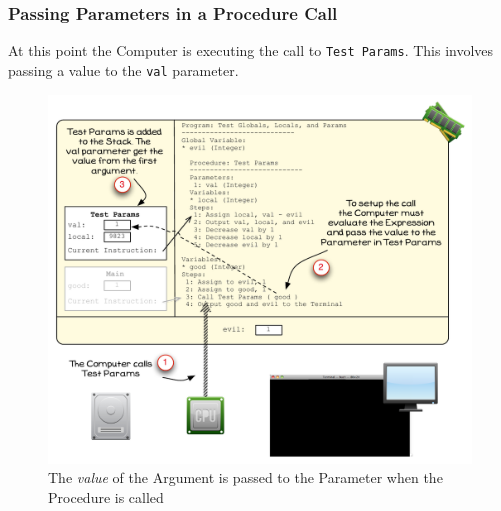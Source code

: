 
\clearpage

\subsubsection{Passing Parameters in a Procedure Call} %
\label{ssub:passing_parameters_in_a_procedure_call}

At this point the Computer is executing the call to \texttt{Test Params}. This involves passing a value to the \texttt{val} parameter.

\begin{figure}[htbp]
   \centering
   \includegraphics[width=\textwidth]{./topics/storing-using-data/images/vis-globals-4} 
   \caption{The \emph{value} of the Argument is passed to the Parameter when the Procedure is called}
   \label{fig:vis-globals-4}
\end{figure}

